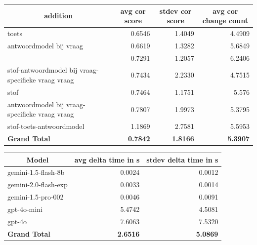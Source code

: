 \documentclass[12pt]{article}
\begin{document}
\noindent\begin{table}[H]\begin{tabularx}{\textwidth}{X *3{r}}
    \toprule
    \multicolumn{1}{c}{\textbf{addition}} & \multicolumn{1}{c}{\textbf{avg cor score}} & \multicolumn{1}{c}{\textbf{stdev cor score}} & \multicolumn{1}{c}{\textbf{avg cor change count}} \\
    \midrule
    toets & 0.6546 & 1.4049 & 4.4909 \\
    antwoordmodel bij vraag & 0.6619 & 1.3282 & 5.6849 \\
    & 0.7291 & 1.2057 & 6.2406 \\
    stof-antwoordmodel bij vraag-specifieke vraag vraag & 0.7434 & 2.2330 & 4.7515 \\
    stof & 0.7464 & 1.1751 & 5.576 \\
    antwoordmodel bij vraag-specifieke vraag vraag & 0.7807 & 1.9973 & 5.3795 \\
    stof-toets-antwoordmodel & 1.1869 & 2.7581 & 5.5953 \\
    \midrule
    \textbf{Grand Total} & \textbf{0.7842} & \textbf{1.8166} & \textbf{5.3907} \\
    \bottomrule
\end{tabularx}%
\end{table}


\noindent\begin{table}[H]\begin{tabularx}{\textwidth}{X *2{r}}
    \toprule
    \multicolumn{1}{c}{\textbf{Model}} & \multicolumn{1}{c}{\textbf{avg delta time in s}} & \multicolumn{1}{c}{\textbf{stdev delta time in s}} \\
    \midrule
    gemini-1.5-flash-8b & 0.0024 & 0.0012 \\
    gemini-2.0-flash-exp & 0.0033 & 0.0014 \\
    gemini-1.5-pro-002 & 0.0046 & 0.0091 \\
    gpt-4o-mini & 5.4742 & 4.5081 \\
    gpt-4o & 7.6063 & 7.5320 \\
    \midrule
    \textbf{Grand Total} & \textbf{2.6516} & \textbf{5.0869} \\
    \bottomrule
\end{tabularx}%
\end{table}
\end{document}
